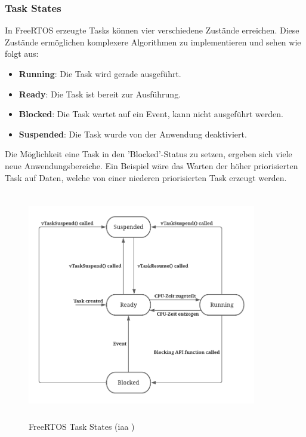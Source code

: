 \documentclass[../EDF Master Thesis.tex]{subfiles}
\begin{document}
\clearpage

\subsubsection{Task States} \label{section:task_states}
In FreeRTOS erzeugte Tasks können vier verschiedene Zustände erreichen.
Diese Zustände ermöglichen komplexere Algorithmen zu implementieren und sehen wie folgt aus:

\begin{itemize}
    \item \textbf{Running}: Die Task wird gerade ausgeführt.
    \item \textbf{Ready}: Die Task ist bereit zur Ausführung.
    \item \textbf{Blocked}: Die Task wartet auf ein Event, kann nicht ausgeführt werden.
    \item \textbf{Suspended}: Die Task wurde von der Anwendung deaktiviert.
\end{itemize}
\begin{center}
    \parencite{freertos-task-states}
\end{center}

Die Möglichkeit eine Task in den 'Blocked'-Status zu setzen, ergeben sich viele neue Anwendungsbereiche.
Ein Beispiel wäre das Warten der höher priorisierten Task auf Daten, welche von einer niederen priorisierten Task erzeugt werden.

\begin{figure}[H]
    \centering
    \includegraphics[height=10cm, width=10cm]{./attachments/FreeRTOS_Task_States.pdf}
    \caption[FreeRTOS Task States]{FreeRTOS Task States (\ac{iaa} \cite{freertos-task-states})}
    \label{fig:FreeRTOS_Task_States}
\end{figure}
\end{document}
